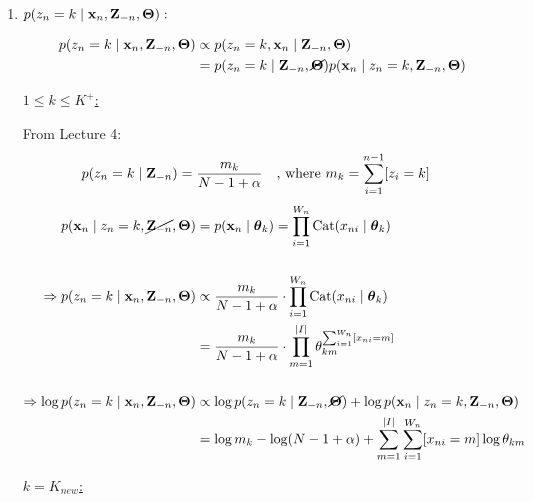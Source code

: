


 
 \begin{enumerate}
   \item 
    \underline{$p(z_n = k \mid \bold{x}_n, \mathbf{Z}_{-n}, \bold{\Theta}):$} 
    
    \begin{align*}
        p(z_n = k \mid \bold{x}_n, \mathbf{Z}_{-n}, \bold{\Theta}) &\propto p(z_n = k, \bold{x}_n \mid \mathbf{Z}_{-n}, \bold{\Theta}) 
        \\
        &= p(z_n = k \mid \mathbf{Z}_{-n}, \cancel{\bold{\Theta}}) p(\bold{x}_n \mid z_n = k, \mathbf{Z}_{-n}, \bold{\Theta})
    \end{align*}
    
    \underline{$1 \leq k \leq K^+$:}
    
    From Lecture 4: 
    \begin{align*}
        p(z_n = k \mid \mathbf{Z}_{-n}) &= \frac{m_k}{N-1 + \alpha} \quad \text{, where }m_k = \sum_{i=1}^{n-1}[z_i = k]
    \end{align*}
    \begin{align*}
        p(\bold{x}_n \mid z_n = k, \cancel{\mathbf{Z}_{-n}}, \bold{\Theta}) &= p(\bold{x}_n \mid \boldsymbol{\theta}_k) = \prod_{i = 1}^{W_n} \operatorname{Cat}(x_{ni} \mid \boldsymbol{\theta}_k)
        \\\\
        \Rightarrow p(z_n = k \mid \bold{x}_n, \mathbf{Z}_{-n}, \bold{\Theta}) &\propto \frac{m_k}{N-1 + \alpha} \cdot \prod_{i = 1}^{W_n} \operatorname{Cat}(x_{ni} \mid \boldsymbol{\theta}_k) 
        \\
        &= \frac{m_k}{N-1 + \alpha} \cdot \prod_{m = 1}^{\vert I \vert} \theta_{km}^{\sum_{i=1}^{W_n}[x_{ni} = m]} 
        \\\\
        \Rightarrow \log p(z_n = k \mid \bold{x}_n, \mathbf{Z}_{-n}, \bold{\Theta}) &\propto \log p(z_n = k \mid \mathbf{Z}_{-n}, \cancel{\bold{\Theta}}) + \log p(\bold{x}_n \mid z_n = k, \mathbf{Z}_{-n}, \bold{\Theta})
        \\
        &= \log m_k -\log(N - 1 + \alpha) + \sum_{m=1}^{\vert I \vert} \sum_{i=1}^{W_n} [x_{ni} = m] \log \theta_{km}
    \end{align*}

    \underline{$k = K_{new}$:}
    

\end{enumerate}

